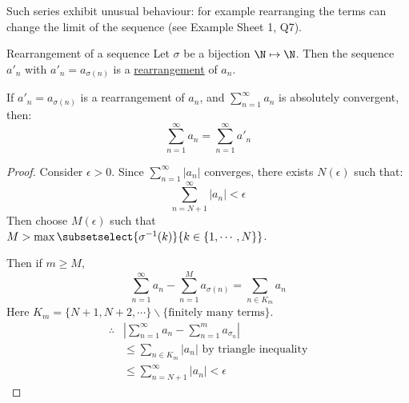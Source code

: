 \documentclass[../Main.tex]{subfiles}
\begin{document}
Such series exhibit unusual behaviour: for example rearranging the terms can change the limit of the sequence (see Example Sheet 1, Q7).
\begin{definition}{Rearrangement of a sequence}
    Let $\sigma$ be a bijection $\N \mapsto \N$. Then the sequence $a'_n$ with $a'_n = a_{\sigma(n)}$ is a \underline{rearrangement} of $a_n$.
\end{definition}
\begin{theorem}
    If $a'_n = a_{\sigma(n)}$ is a rearrangement of $a_n$, and $\sum_{n=1}^\infty a_n$ is absolutely convergent, then:
    \begin{equation*}
        \sum_{n=1}^\infty a_n = \sum_{n=1}^\infty a'_n
    \end{equation*}
\end{theorem}
\begin{proof}
    Consider $\epsilon > 0$. Since $\sum_{n=1}^\infty |a_n|$ converges, there exists $N(\epsilon)$ such that:
    \begin{equation*}
        \sum_{n=N+1}^\infty |a_n| < \epsilon
    \end{equation*}
    Then choose $M(\epsilon)$ such that $M > \max\subsetselect{\sigma^{-1}(k)}{k \in \{1, \cdots, N\}}$.

    Then if $m \geq M$,
    \begin{equation*}
        \sum_{n=1}^\infty a_n - \sum_{n=1}^M a_{\sigma(n)} = \sum_{n \in K_m} a_n
    \end{equation*}
    Here $K_m = \{N+1, N+2, \cdots\} \backslash \{\text{finitely many terms}\}$.
    \begin{align*}
        \therefore& \left|\sum_{n=1}^\infty a_n - \sum_{n=1}^m a_{\sigma_n}\right| \\
        &\leq \sum_{n \in K_m} |a_n| \text{ by triangle inequality} \\
        &\leq \sum_{n=N+1}^\infty |a_n| < \epsilon
    \end{align*}
\end{proof}
\end{document}
